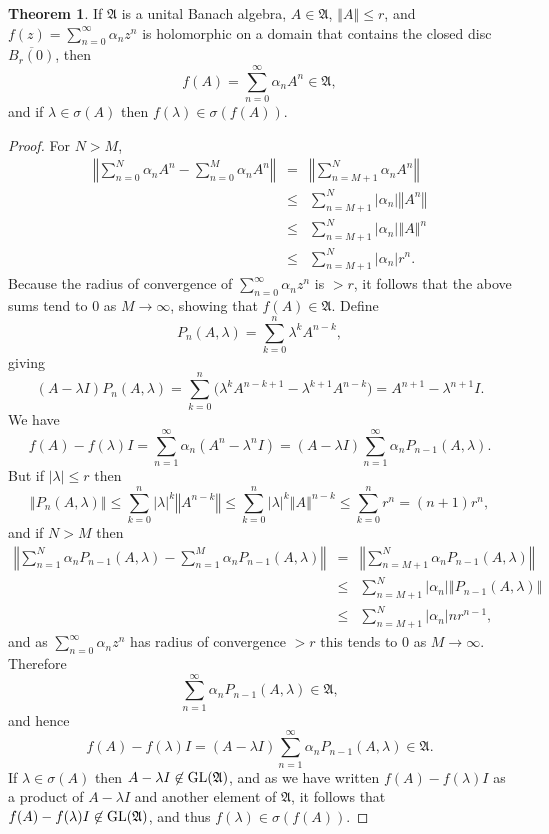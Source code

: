 \documentclass{article}
\newcommand{\GL}{\ensuremath\mathrm{GL}}
\newcommand{\norm}[1]{\left\Vert #1 \right\Vert}
\theoremstyle{definition}
\newtheorem{theorem}{Theorem}
\theoremstyle{definition}
\begin{document}
\begin{theorem}
If $\mathfrak{A}$ is a unital Banach algebra, $A \in \mathfrak{A}$, $\norm{A} \leq r$, and $f(z)=\sum_{n=0}^\infty \alpha_n z^n$ is holomorphic on a domain that contains the closed disc $\overline{B_r(0)}$,
then
\[
f(A)=\sum_{n=0}^\infty \alpha_n A^n \in \mathfrak{A},
\]
and if $\lambda \in \sigma(A)$ then $f(\lambda) \in \sigma(f(A))$.
\label{mapping}
\end{theorem}
\begin{proof}
For $N>M$,
\begin{eqnarray*}
\norm{\sum_{n=0}^N \alpha_n A^n -\sum_{n=0}^M \alpha_n A^n} &=&\norm{ \sum_{n=M+1}^N \alpha_n A^n}\\
&\leq& \sum_{n=M+1}^N |\alpha_n| \norm{A^n}\\
&\leq&\sum_{n=M+1}^N |\alpha_n| \norm{A}^n\\
&\leq&\sum_{n=M+1}^N |\alpha_n| r^n.
\end{eqnarray*}
Because the radius of convergence of $\sum_{n=0}^\infty \alpha_n z^n$ is $>r$, it follows that the above sums tend to $0$ as $M \to \infty$, showing that
$f(A) \in \mathfrak{A}$.
Define
\[
P_n(A,\lambda)=\sum_{k=0}^n \lambda^k A^{n-k},
\]
giving
\[
(A-\lambda I)P_n(A,\lambda)=\sum_{k=0}^n\Big( \lambda^k A^{n-k+1} -  \lambda^{k+1} A^{n-k}\Big)
=A^{n+1} - \lambda^{n+1} I.
\]
We have
\[
f(A)-f(\lambda)I = \sum_{n=1}^\infty \alpha_n(A^n - \lambda^n I) =
(A-\lambda I) \sum_{n=1}^\infty \alpha_n P_{n-1}(A,\lambda).
\]
But  if $|\lambda| \leq r$ then
\[
\norm{P_n(A,\lambda)} \leq \sum_{k=0}^n |\lambda|^k \norm{A^{n-k}}
\leq \sum_{k=0}^n |\lambda|^k \norm{A}^{n-k} \leq \sum_{k=0}^n r^n=(n+1)r^n,
\]
and if $N>M$ then
\begin{eqnarray*}
\norm{\sum_{n=1}^N \alpha_n P_{n-1}(A,\lambda) - \sum_{n=1}^M \alpha_n P_{n-1}(A,\lambda)}&=&
\norm{\sum_{n=M+1}^N \alpha_n P_{n-1}(A,\lambda)}\\
&\leq&\sum_{n=M+1}^N |\alpha_n| \norm{P_{n-1}(A,\lambda)}\\
&\leq&\sum_{n=M+1}^N |\alpha_n| n r^{n-1},
\end{eqnarray*}
and as $\sum_{n=0}^\infty \alpha_n z^n$ has radius of convergence $>r$ this tends to $0$ as $M \to \infty$.
Therefore
\[
\sum_{n=1}^\infty \alpha_n P_{n-1}(A,\lambda) \in \mathfrak{A},
\]
and hence
\[
f(A)-f(\lambda)I = (A-\lambda I) \sum_{n=1}^\infty \alpha_n P_{n-1}(A,\lambda) \in \mathfrak{A}.
\]
If $\lambda \in \sigma(A)$ then $A-\lambda I \not \in \GL(\mathfrak{A})$, and as we have written $f(A)-f(\lambda)I$ as a product of $A-\lambda I$ and another element of $\mathfrak{A}$,
it follows that $f(A)-f(\lambda)I \not \in \GL(\mathfrak{A})$, and thus $f(\lambda) \in \sigma(f(A))$.
\end{proof}
\end{document}
